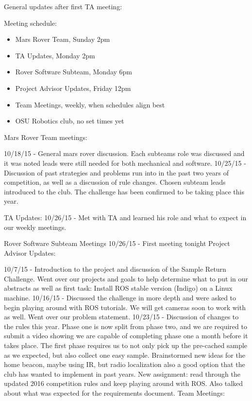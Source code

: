 \documentclass[10pt, oneside,onecolumn]{IEEEtran}
\begin{document}
\begin{titlepage}
General updates after first TA meeting:

Meeting schedule:
\begin{itemize}
\item Mars Rover Team, Sunday 2pm
\item TA Updates, Monday 2pm
\item Rover Software Subteam, Monday 6pm
\item Project Advisor Updates, Friday 12pm
\item Team Meetings, weekly, when schedules align best
\item OSU Robotics club, no set times yet
\end{itemize}

Mars Rover Team meetings:

10/18/15 - General mars rover discussion. Each subteams role was discussed and it was noted leads were still needed for both mechanical and software.
10/25/15 - Discussion of past strategies and problems run into in the past two years of competition, as well as a discussion of rule changes. Chosen subteam leads introduced to the club. The challenge has been confirmed to be taking place this year.

TA Updates:
10/26/15 - Met with TA and learned his role and what to expect in our weekly meetings.

Rover Software Subteam Meetings
10/26/15 - First meeting tonight
Project Advisor Updates: 

10/7/15 - Introduction to the project and discussion of the Sample Return Challenge. Went over our projects and goals to help determine what to put in our abstracts as well as first task: Install ROS stable version (Indigo) on a Linux machine.
 10/16/15 - Discussed the challenge in more depth and were asked to begin playing around with ROS tutorials. We will get cameras soon to work with as well. Went over our problem statement.
10/23/15 - Discussion of changes to the rules this year. Phase one is now split from phase two, and we are required to submit a video showing we are capable of completing phase one a month before it takes place. The first phase requires us to not only pick up the pre-cached sample as we expected, but also collect one easy sample. Brainstormed new ideas for the home beacon, maybe using IR, but radio localization also a good option that the club has wanted to implement in past years. New assignment: read through the updated 2016 competition rules and keep playing around with ROS. Also talked about what was expected for the requirements document.
Team Meetings:


\end{titlepage}
\end{document}
